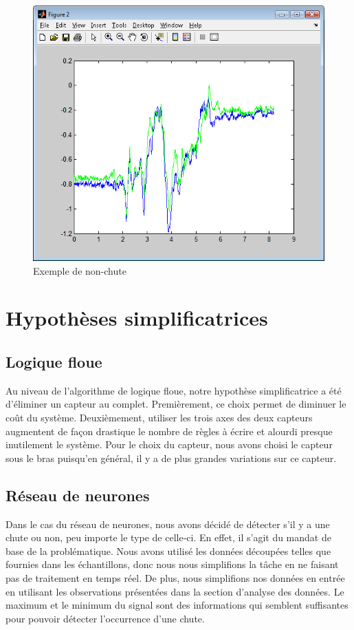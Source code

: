 \documentclass[12pt,letterpaper]{article}
\begin{document}
\begin{figure}
\centering
\includegraphics[scale=0.5]{images/non_chute.png}
\caption{Exemple de non-chute}
\label{fig:non_chute}
\end{figure}

\section{Hypothèses simplificatrices}

\subsection{Logique floue}

Au niveau de l'algorithme de logique floue, notre hypothèse simplificatrice a été d'éliminer un capteur au complet. Premièrement, ce choix permet de diminuer le coût du système. Deuxièmement, utiliser les trois axes des deux capteurs augmentent de façon drastique le nombre de règles à écrire et alourdi presque inutilement le système. Pour le choix du capteur, nous avons choisi le capteur sous le bras puisqu'en général, il y a de plus grandes variations sur ce capteur.

\subsection{Réseau de neurones} %
Dans le cas du réseau de neurones, nous avons décidé de détecter s'il y a une chute ou non, peu importe le type de celle-ci. En effet, il s'agit du mandat de base de la problématique. Nous avons utilisé les données découpées telles que fournies dans les échantillons, donc nous nous simplifions la tâche en ne faisant pas de traitement en temps réel. De plus, nous simplifions nos données en entrée en utilisant les observations présentées dans la section d'analyse des données. Le maximum et le minimum du signal sont des informations qui semblent suffisantes pour pouvoir détecter l'occurrence d'une chute.
\end{document}
